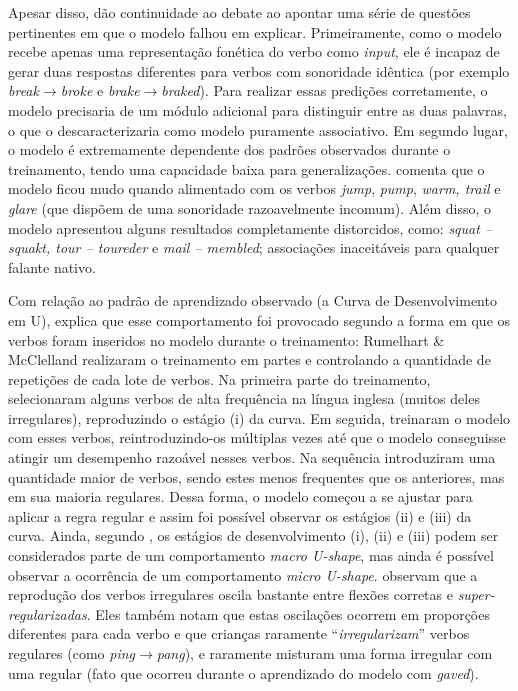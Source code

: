 Apesar disso, \cite{Pinker:1988} dão continuidade ao debate ao apontar uma série de questões pertinentes em que o modelo falhou em explicar. Primeiramente, como o modelo recebe apenas uma representação fonética do verbo como \textit{input}, ele é incapaz de gerar duas respostas diferentes para verbos com sonoridade idêntica (por exemplo \textit{break}$\rightarrow$\textit{broke} e \textit{brake}$\rightarrow$\textit{braked}). Para realizar essas predições corretamente, o modelo precisaria de um módulo adicional para distinguir entre as duas palavras, o que o descaracterizaria como modelo puramente associativo. Em segundo lugar, o modelo é extremamente dependente dos padrões observados durante o treinamento, tendo uma capacidade baixa para generalizações. \cite{Pinker:1999} comenta que o modelo ficou mudo quando alimentado com os verbos \textit{jump}, \textit{pump}, \textit{warm, trail} e \textit{glare} (que dispõem de uma sonoridade razoavelmente incomum). Além disso, o modelo apresentou alguns resultados completamente distorcidos, como: \textit{squat – squakt, tour – toureder} e \textit{mail – membled}; associações inaceitáveis para qualquer falante nativo. 

Com relação ao padrão de aprendizado observado (a Curva de Desenvolvimento em U), \cite{Pinker:1999} explica que esse comportamento foi provocado segundo a forma em que os verbos foram inseridos no modelo durante o treinamento: Rumelhart \& McClelland realizaram o treinamento em partes e controlando a quantidade de repetições de cada lote de verbos. Na primeira parte do treinamento, selecionaram alguns verbos de alta frequência na língua inglesa (muitos deles irregulares), reproduzindo o estágio (i) da curva. Em seguida, treinaram o modelo com esses verbos, reintroduzindo-os múltiplas vezes até que o modelo conseguisse atingir um desempenho razoável nesses verbos. Na sequência introduziram uma quantidade maior de verbos, sendo estes menos frequentes que os anteriores, mas em sua maioria regulares. Dessa forma, o modelo começou a se ajustar para aplicar a regra regular e assim foi possível observar os estágios (ii) e (iii) da curva. Ainda, segundo \cite{pluket:1991}, os estágios de desenvolvimento (i), (ii) e (iii) podem ser considerados parte de um comportamento \textit{macro U-shape}, mas ainda é possível observar a ocorrência de um comportamento \textit{micro U-shape}. \cite{pluket:1991} observam que a reprodução dos verbos irregulares oscila bastante entre flexões corretas e \textit{super-regularizadas}. Eles também notam que estas oscilações ocorrem em proporções diferentes para cada verbo e que crianças raramente “\textit{irregularizam}” verbos regulares (como \textit{ping}$\rightarrow$\textit{pang}), e raramente misturam uma forma irregular com uma regular (fato que ocorreu durante o aprendizado do modelo com \textit{gaved}).

